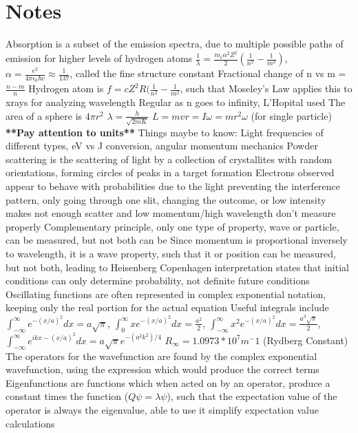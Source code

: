 \documentclass[11 pt, twoside]{article}
\newenvironment{outline*}
{
	\begin{outline}[enumerate]
	}
	{\end{outline}
}
\begin{document}
\section{Notes}
\begin{outline*}
\1 Absorption is a subset of the emission spectra, due to multiple possible paths of emission for higher levels of hydrogen atoms
\1 $\frac{1}{\lambda} = \frac{m_e \alpha^2 Z^2}{2} (\frac{1}{n^2} - \frac{1}{m^2})$, $\alpha = \frac{e^2}{4\pi \epsilon_0 \hbar c} \approx \frac{1}{137}$, called the fine structure constant
\1 Fractional change of n vs m = $\frac{n - m}{n}$
\1 Hydrogen atom is $f = cZ^2R(\frac{1}{n^2} - \frac{1}{m^2}$, such that Moseley's Law applies this to xrays for analyzing wavelength
\1 Regular as n goes to infinity, L'Hopital used 
\1 The area of a sphere is $4\pi r^2$
\1 $\lambda = \frac{h}{\sqrt{2mK}}$
\1 $L = mvr = I\omega = mr^2 \omega$ (for single particle)
\1 \textbf{**Pay attention to units**}
\1 Things maybe to know: Light frequencies of different types, eV vs J conversion, angular momentum mechanics
\1 Powder scattering is the scattering of light by a collection of crystallites with random orientations, forming circles of peaks in a target formation
\1 Electrons observed appear to behave with probabilities due to the light preventing the interference pattern, only going through one slit, changing the outcome, or low intensity makes not enough scatter and low momentum/high wavelength don't measure properly
	\2 Complementary principle, only one type of property, wave or particle, can be measured, but not both can be
		\3 Since momentum is proportional inversely to wavelength, it is a wave property, such that it or position can be measured, but not both, leading to Heisenberg
\1 Copenhagen interpretation states that initial conditions can only determine probability, not definite future conditions
\1 Oscillating functions are often represented in complex exponential notation, keeping only the real portion for the actual equation
\1 Useful integrals include $\int^{\infty}_{-\infty} e^{-(x/a)^2}dx = a\sqrt{\pi}$, $\int^{\infty}_{0} xe^{-(x/a)^2}dx = \frac{a^2}{2}$, $\int^{\infty}_{-\infty} x^2 e^{-(x/a)^2}dx = \frac{a^3\sqrt{\pi}}{2}$, $\int^{\infty}_{-\infty} e^{ikx-(x/a)^2}dx = a\sqrt{\pi}e^{-(a^2k^2)/4}$
\1 $R_{\infty} = 1.0973 * 10^7 m^-1$ (Rydberg Constant)
\1 The operators for the wavefunction are found by the complex exponential wavefunction, using the expression which would produce the correct terms
	\2 Eigenfunctions are functions which when acted on by an operator, produce a constant times the function ($Q\psi = \lambda \psi$), such that the expectation value of the operator is always the eigenvalue, able to use it simplify expectation value calculations

\end{outline*}
\end{document}
